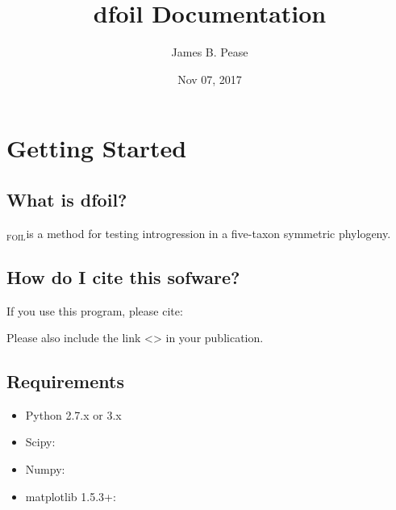 \documentclass[letterpaper,12pt,english]{sphinxmanual}
\title{dfoil Documentation}
\date{Nov 07, 2017}
\author{James B. Pease}
\begin{document}
\maketitle
\sphinxtableofcontents
{}\label{\detokenize{index::doc}}



\chapter{Getting Started}
\label{\detokenize{intro:welcome-to-dfoil-s-documentation}}\label{\detokenize{intro:getting-started}}\label{\detokenize{intro::doc}}

\section{What is dfoil?}
\label{\detokenize{intro:what-is-dfoil}}
$_{\text{FOIL}}$is a method for testing introgression in a five-taxon symmetric phylogeny.


\section{How do I cite this sofware?}
\label{\detokenize{intro:how-do-i-cite-this-sofware}}
If you use this program, please cite:


Please also include the link \textless{}\textgreater{} in your publication.


\section{Requirements}
\label{\detokenize{intro:requirements}}\begin{itemize}
\item {} 
Python 2.7.x or 3.x

\item {} 
Scipy: 

\item {} 
Numpy: 

\item {} 
matplotlib 1.5.3+: 

\end{itemize}
\end{document}
